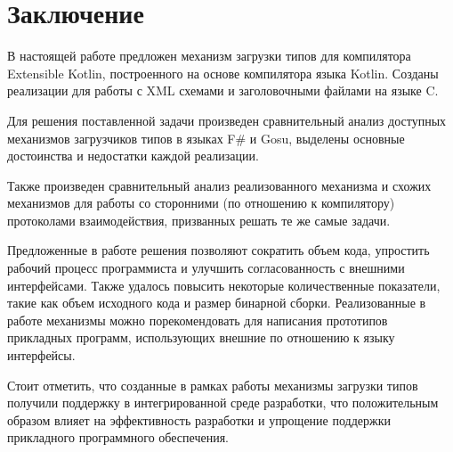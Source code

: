 \clearpage
\section*{Заключение}

В настоящей работе предложен механизм загрузки типов для компилятора Extensible Kotlin, построенного на основе компилятора языка Kotlin.
Созданы реализации для работы с XML схемами и заголовочными файлами на языке C.

Для решения поставленной задачи произведен сравнительный анализ доступных механизмов загрузчиков типов в языках
F\# и Gosu, выделены основные достоинства и недостатки каждой реализации.

Также произведен сравнительный анализ реализованного механизма и схожих механизмов для работы со сторонними
(по отношению к компилятору) протоколами взаимодействия, призванных решать те же самые задачи.

Предложенные в работе решения позволяют сократить объем кода, упростить рабочий процесс программиста и улучшить согласованность с внешними интерфейсами.
Также удалось повысить некоторые количественные показатели, такие как объем исходного кода и размер бинарной сборки.
Реализованные в работе механизмы можно порекомендовать для написания прототипов прикладных программ, использующих внешние по отношению к языку интерфейсы.

Стоит отметить, что созданные в рамках работы механизмы загрузки типов получили поддержку в интегрированной среде разработки, что положительным образом влияет на эффективность разработки и упрощение поддержки прикладного программного обеспечения.

\clearpage